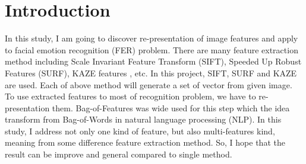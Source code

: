 \documentclass[12pt]{article}
\begin{document}
\newpage



\section{Introduction}

In this study, I am going to discover re-presentation of image features and apply to facial emotion recognition (FER) problem.
There are many feature extraction method including Scale Invariant Feature Transform \cite{Lowe2004} (SIFT), Speeded Up Robust Features \cite{Bay06} (SURF), KAZE features \cite{alcantarilla2012kaze}, etc.
In this project, SIFT, SURF and KAZE are used.
Each of above method will generate a set of vector from given image.
To use extracted features to most of recognition problem, we have to re-presentation them.
Bag-of-Features \cite{nowak2006sampling} was wide used for this step which the idea transform from Bag-of-Words in natural language processing (NLP).
In this study, I address not only one kind of feature, but also multi-features kind, meaning from some difference feature extraction method.
So, I hope that the result can be improve and general compared to single method.
\end{document}
